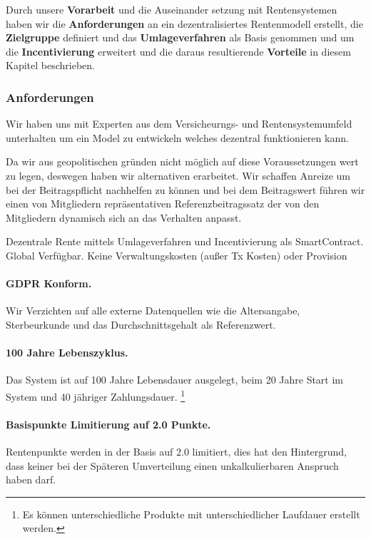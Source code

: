 Durch unsere \textbf{Vorarbeit} und die Auseinander setzung mit Rentensystemen haben wir die \textbf{Anforderungen} an ein dezentralisiertes Rentenmodell erstellt, die  \textbf{Zielgruppe} definiert und das \textbf{Umlageverfahren} als Basis genommen und um die \textbf{Incentivierung} erweitert und die daraus resultierende \textbf{Vorteile} in diesem Kapitel beschrieben.

\subsubsection{Anforderungen}
Wir haben uns mit Experten aus dem Versicheurngs- und Rentensystemumfeld unterhalten um ein Model zu entwickeln welches dezentral funktionieren kann.

Da wir aus geopolitischen gründen nicht möglich auf diese Voraussetzungen wert zu legen, deswegen haben wir alternativen erarbeitet.
Wir schaffen Anreize um bei der Beitragspflicht nachhelfen zu können und bei dem Beitragswert führen wir einen von Mitgliedern repräsentativen Referenzbeitragssatz der von den Mitgliedern dynamisch sich an das Verhalten anpasst.

Dezentrale Rente mittels Umlageverfahren und Incentivierung als SmartContract.
Global Verfügbar. Keine Verwaltungskosten (außer Tx Kosten) oder Provision

\paragraph{GDPR\cite{gdpr} Konform.} Wir Verzichten auf alle externe Datenquellen wie die Altersangabe, Sterbeurkunde und das Durchschnittsgehalt als Referenzwert.

\paragraph{100 Jahre Lebenszyklus.} Das System ist auf 100 Jahre Lebensdauer ausgelegt, beim 20 Jahre Start im System und 40 jähriger Zahlungsdauer. \footnote{ Es können unterschiedliche Produkte mit unterschiedlicher Laufdauer erstellt werden.} 

\paragraph{Basispunkte Limitierung auf 2.0 Punkte.} Rentenpunkte werden in der Basis auf 2.0 limitiert, dies hat den Hintergrund, dass keiner bei der Späteren Umverteilung einen unkalkulierbaren Anspruch haben darf.

